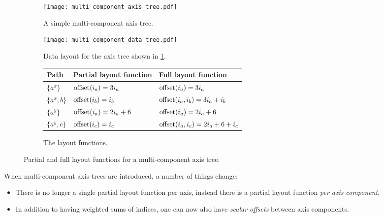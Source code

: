 \documentclass[thesis]{subfiles}
\begin{document}

\begin{figure}
  \centering
  \begin{subfigure}{.4\textwidth}
    \centering
    \texttt{[image: multi\_component\_axis\_tree.pdf]}
    \caption{A simple multi-component axis tree.}
    \label{fig:multi_component_axis_tree}
  \end{subfigure}
  \begin{subfigure}{.5\textwidth}
    \centering
    \texttt{[image: multi\_component\_data\_tree.pdf]}
    \caption{Data layout for the axis tree shown in \cref{fig:multi_component_axis_tree}.}
  \end{subfigure}

  \vspace{1em}

  \begin{subfigure}{\textwidth}
    \centering
    \begin{tabular}{|l|l|l|}
      \hline
      \textbf{Path} & \textbf{Partial layout function} & \textbf{Full layout function} \\
      \hline
      $\{ a^x \}$ & $\textnormal{offset}(i_a) = 3 i_a$ & $\textnormal{offset}(i_a) = 3 i_a$ \\
      \hline
      $\{ a^x, b \}$ & $\textnormal{offset}(i_b) = i_b$ & $\textnormal{offset}(i_a, i_b) = 3 i_a + i_b$ \\
      \hline
      $\{ a^y \}$ & $\textnormal{offset}(i_a) = 2 i_a + 6$ & $\textnormal{offset}(i_a) = 2 i_a + 6$ \\
      \hline
      $\{ a^y, c \}$ & $\textnormal{offset}(i_c) = i_c$ & $\textnormal{offset}(i_a, i_c) = 2 i_a + 6 + i_c$ \\
      \hline
    \end{tabular}
    \caption{
      The layout functions.
    }
    \label{fig:multi_component_layouts}
  \end{subfigure}

  \caption{Partial and full layout functions for a multi-component axis tree.}
  \label{fig:multi_component_axis_tree_all}
\end{figure}

When multi-component axis trees are introduced, a number of things change:

\begin{itemize}
  \item
    There is no longer a single partial layout function per axis, instead there is a partial layout function \textit{per axis component}.

  \item
    In addition to having weighted sums of indices, one can now also have \textit{scalar offsets} between axis components.
\end{itemize}
\end{document}
